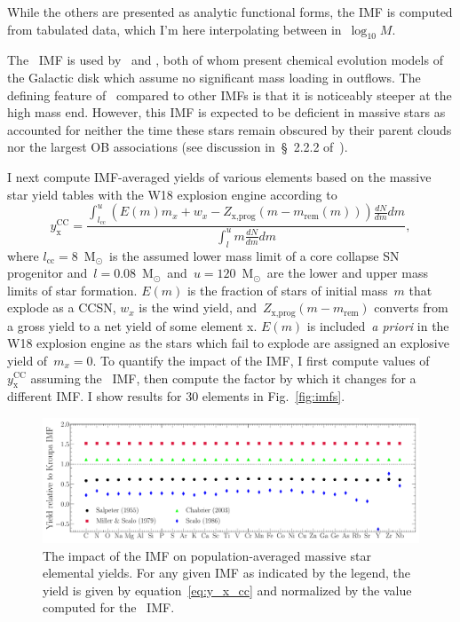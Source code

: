 \documentclass[12pt]{article}
\newcommand{\ddfrac}[2]{\frac{\displaystyle{#1}}{\displaystyle{#2}}}
\newcommand{\msun}{\ensuremath{\text{M}_\odot}}
\begin{document}
While the others are presented as analytic functional forms, the
\citet{Scalo1986} IMF is computed from tabulated data, which I'm here
interpolating between in~$\log_{10} M$.
\par
The~\citet{Scalo1986} IMF is used by~\citet*{Minchev2013} and
\citet{Spitoni2019}, both of whom present chemical evolution models of the
Galactic disk which assume no significant mass loading in outflows.
The defining feature of~\citet{Scalo1986} compared to other IMFs is that it is
noticeably steeper at the high mass end.
However, this IMF is expected to be deficient in massive stars as
\citet{Scalo1986} accounted for neither the time these stars remain obscured by
their parent clouds nor the largest OB associations (see discussion
in~\S~2.2.2 of~\citealt*{Parravano2011}).
\par
I next compute IMF-averaged yields of various elements based on the
\citet{Sukhbold2016} massive star yield tables with the W18 explosion engine
according to
\begin{equation}
y_\text{x}^\text{CC} = \ddfrac{
	\int_{l_\text{cc}}^u (E(m)m_x + w_x - Z_\text{x,prog}(m - m_\text{rem}(m)))
	\frac{dN}{dm}dm
}{
	\int_l^u m\frac{dN}{dm}dm
},
\label{eq:y_x_cc}
\end{equation}
where $l_\text{cc} = 8$~\msun~is the assumed lower mass limit of a core
collapse SN progenitor and~$l = 0.08$~\msun~and~$u = 120$~\msun~are the lower
and upper mass limits of star formation.
$E(m)$ is the fraction of stars of initial mass~$m$ that explode as a CCSN,
$w_x$ is the wind yield, and~$Z_\text{x,prog}(m - m_\text{rem})$ converts from
a gross yield to a net yield of some element x.
$E(m)$ is included~\textit{a priori} in the W18 explosion engine as the stars
which fail to explode are assigned an explosive yield of~$m_x = 0$.
To quantify the impact of the IMF, I first compute values
of~$y_\text{x}^\text{CC}$ assuming the~\citet{Kroupa2001} IMF, then compute
the factor by which it changes for a different IMF.
I show results for 30 elements in Fig.~\ref{fig:imfs}.

\begin{figure}
\centering
\includegraphics[scale = 0.42]{yields_relative_to_kroupa.pdf}
\caption{
The impact of the IMF on population-averaged massive star elemental yields.
For any given IMF as indicated by the legend, the yield is given by
equation~\ref{eq:y_x_cc} and normalized by the value computed for
the~\citet{Kroupa2001} IMF.
}
\label{fig:yields}
\end{figure}
\end{document}
